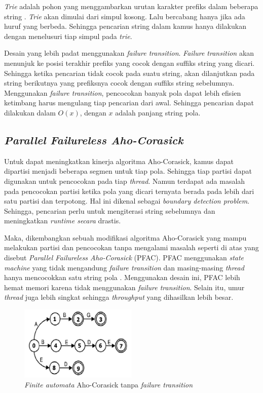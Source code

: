     \emph{Trie} adalah pohon yang menggambarkan urutan karakter prefiks dalam beberapa string \parencite{trie59}. \emph{Trie} akan dimulai dari simpul kosong. Lalu bercabang hanya jika ada huruf yang berbeda. Sehingga pencarian string dalam kamus hanya dilakukan dengan menelusuri tiap simpul pada \emph{trie}. 

    Desain yang lebih padat menggunakan \emph{failure transition}. \emph{Failure transition} akan menunjuk ke posisi terakhir prefiks yang cocok dengan suffiks string yang dicari. Sehingga ketika pencarian tidak cocok pada suatu string, akan dilanjutkan pada string berikutnya yang prefiksnya cocok dengan suffiks string sebelumnya. Menggunakan \emph{failure transition}, pencocokan banyak pola dapat lebih efisien ketimbang harus mengulang tiap pencarian dari awal. Sehingga pencarian dapat dilakukan dalam $O(x)$, dengan $x$ adalah panjang string pola.

  \subsection {\emph{Parallel Failureless Aho-Corasick}}

    Untuk dapat meningkatkan kinerja algoritma Aho-Corasick, kamus dapat dipartisi menjadi beberapa segmen untuk tiap pola. Sehingga tiap partisi dapat digunakan untuk pencocokan pada tiap \emph{thread}. Namun terdapat ada masalah pada pencocokan partisi ketika pola yang dicari ternyata berada pada lebih dari satu partisi dan terpotong. Hal ini dikenal sebagai \emph{boundary detection problem}. Sehingga, pencarian perlu untuk mengiterasi string sebelumnya dan meningkatkan \emph{runtime secara} drastis.

    Maka, dikembangkan sebuah modifikasi algoritma Aho-Corasick yang mampu melakukan partisi dan pencocokan tanpa mengalami masalah seperti di atas yang disebut \emph{Parallel Failureless Aho-Corasick} (PFAC). PFAC menggunakan \emph{state machine} yang tidak mengandung \emph{failure transition} dan masing-masing \emph{thread} hanya mencocokkan satu string pola \parencite{lin2013}. Menggunakan desain ini, PFAC lebih hemat memori karena tidak menggunakan \emph{failure transition}. Selain itu, umur \emph{thread} juga lebih singkat sehingga \emph{throughput} yang dihasilkan lebih besar.

    \begin{figure}[H]
      \centering
      \includegraphics[width=0.5\textwidth]{resources/pfac.png}
      \caption[\emph{Finite automata} Aho-Corasick tanpa \emph{failure transition}]{\emph{Finite automata} Aho-Corasick tanpa \emph{failure transition} \parencite{lin2013}}
    \end{figure}

